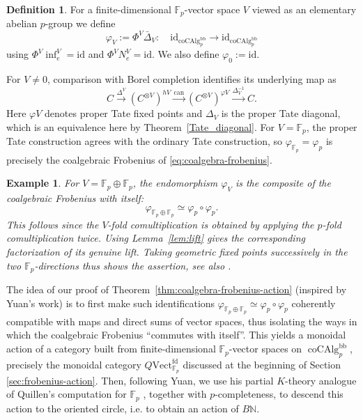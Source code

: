 \documentclass[11pt,a4paper]{article}
\newtheorem{example}[thm]{Example}
\theoremstyle{definition}
\newtheorem{defn}[thm]{Definition}
\newcommand{\Fp}{\mathbb F_p}
\newcommand{\coAlg}{\operatorname{coCAlg}}
\newcommand{\id}{\mathrm{id}}
\newcommand{\infl}{\operatorname{inf}}
\newcommand{\Vect}{\mathrm{Vect}^{\mathrm{fd}}_{\Fp}}
\begin{document}
\begin{defn}\label{def:vector-frobenius}
For a finite-dimensional $\Fp$-vector space $V$ viewed as an
elementary abelian $p$-group we
define
\[
\varphi_V:=\Phi^V  \bar{\Delta}_V:\quad \id_{\coAlg_p^{\mathrm{bb}}}\to\id_{\coAlg_p^{\mathrm{bb}}}
\]
using
$\Phi^V\infl_e^V= \id$ and $\Phi^VN_e^V = \id$. We also define $\varphi_0:=\id$.
\end{defn}
For $V\ne0$, comparison with Borel completion identifies its underlying map as
\begin{equation}\label{eq:frob}
 C\xrightarrow{\Delta^V} (C^{\otimes V})^{hV}
 \xrightarrow{\mathrm{can}}(C^{\otimes V})^{\varphi V}
 \xrightarrow{\Delta_V^{-1}}C.
\end{equation}
Here $\varphi V$ denotes proper Tate fixed points and $\Delta_V$ is
the proper Tate diagonal, which is an equivalence here by
Theorem~\ref{Tate_diagonal}. For $V=\Fp$, the proper Tate construction agrees with the ordinary Tate construction, so
$\varphi_{\Fp}=\varphi_p$ is precisely the coalgebraic Frobenius of
\eqref{eq:coalgebra-frobenius}. 

\begin{example}
For $V=\Fp\oplus\Fp$, the endomorphism $\varphi_V$ is the composite
of the coalgebraic Frobenius with itself:
\[
 \varphi_{\Fp\oplus\Fp}\simeq\varphi_p\circ\varphi_p.
\]
This follows since the $V$-fold comultiplication is obtained by applying the
$p$-fold comultiplication twice. Using Lemma~\ref{lem:lift} gives the corresponding factorization of its
genuine lift. Taking geometric fixed points successively in the two
$\Fp$-directions thus shows the assertion, see also 
\cite[Examples 2.11 and 2.12]{Yuan}.
\end{example}

The idea of our proof of 
Theorem~\ref{thm:coalgebra-frobenius-action} (inspired by Yuan's work) 
is to first make such
identifications 
$ \varphi_{\Fp\oplus\Fp}\simeq\varphi_p\circ\varphi_p$
coherently compatible with maps and direct
sums of vector spaces, thus isolating the ways in which the coalgebraic Frobenius ``commutes with itself''.
This yields a monoidal action of a
category built from finite-dimensional $\Fp$-vector spaces
on $\coAlg_p^{\mathrm{bb}}$, precisely the monoidal category $Q\Vect$ discussed at the beginning of Section \ref{sec:frobenius-action}.
Then, following Yuan, we use his partial $K$-theory analogue
of Quillen's computation for $\Fp$
\cite[Theorem 5.2]{Yuan}, together with $p$-completeness,
to descend this action to the oriented circle, i.e. to obtain
an action of $B\mathbb N$.
\end{document}
